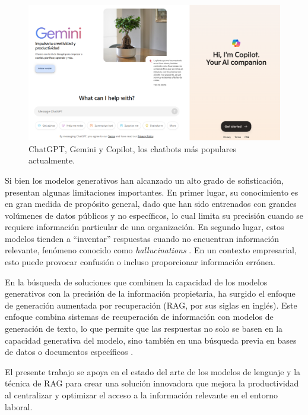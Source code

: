 \begin{figure}[ht]
	\centering
	\includegraphics[scale=.38]{./Figures/chatbots.png}
	\caption{ChatGPT, Gemini y Copilot, los chatbots más populares actualmente.}
	\label{fig:chatbots}
\end{figure}

\vspace{15mm}

Si bien los modelos generativos han alcanzado un alto grado de sofisticación, presentan algunas limitaciones importantes. 
En primer lugar, su conocimiento es en gran medida de propósito general, dado que han sido entrenados con grandes volúmenes 
de datos públicos y no específicos, lo cual limita su precisión cuando se requiere información particular de una organización. 
En segundo lugar, estos modelos tienden a ``inventar'' respuestas cuando no encuentran información relevante, fenómeno conocido 
como \textit{hallucinations} \citep{article:hallucinations}. En un contexto empresarial, esto puede provocar confusión o incluso 
proporcionar información errónea.

En la búsqueda de soluciones que combinen la capacidad de los modelos generativos con la precisión de la información propietaria, 
ha surgido el enfoque de generación aumentada por recuperación (RAG, por sus siglas en inglés). Este enfoque combina sistemas de 
recuperación de información con modelos de generación de texto, lo que permite que las respuestas no solo se basen en la capacidad 
generativa del modelo, sino también en una búsqueda previa en bases de datos o documentos específicos \citep{paper:rag-1} 
\citep{paper:rag-2}.

El presente trabajo se apoya en el estado del arte de los modelos de lenguaje y la técnica de RAG para crear una solución innovadora 
que mejora la productividad al centralizar y optimizar el acceso a la información relevante en el entorno laboral.

